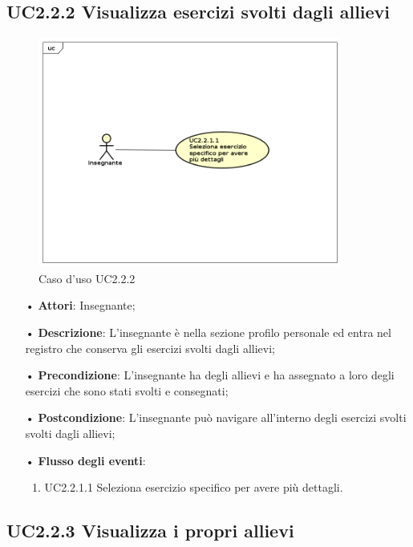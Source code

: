\subsection{UC2.2.2  Visualizza esercizi svolti dagli allievi}
\begin{figure}[H]
\centering
\includegraphics[width=10cm]{img/UC222.png} 
\caption{Caso d'uso UC2.2.2}
\end{figure}
\begin{itemize}
	\item[•] \textbf{Attori}:  Insegnante;
	\item[•] \textbf{Descrizione}:  L’insegnante è nella sezione profilo personale ed entra
		nel registro che conserva gli esercizi svolti dagli allievi;
	\item[•] \textbf{Precondizione}:  L’insegnante ha degli allievi e ha assegnato a loro degli esercizi che sono stati svolti e consegnati;

	\item[•] \textbf{Postcondizione}: L’insegnante può navigare all’interno degli esercizi svolti 
                       svolti dagli allievi; 

	\item[•] \textbf{Flusso degli eventi}:
		\begin{enumerate}
			\item UC2.2.1.1  Seleziona esercizio specifico per avere più dettagli.	
		\end{enumerate}
\end{itemize}

\subsection{UC2.2.3 Visualizza i propri allievi}

